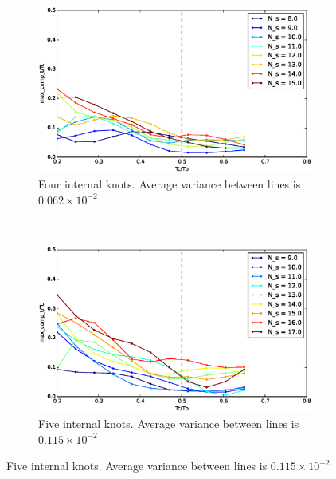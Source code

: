 \begin{figure}[!h]
        \centering
        \begin{subfigure}[b]{0.48\textwidth}
                \includegraphics[width=\textwidth]{./img/realtime/Scenario_0__N_knots_4/mcttc-tctp.eps}
                \caption{Four internal knots. Average variance between lines is $0.062\times 10^{-2}$}\label{fig:uni04}
        \end{subfigure}%
        ~ %
        \begin{subfigure}[b]{0.48\textwidth}
                \includegraphics[width=\textwidth]{./img/realtime/Scenario_0__N_knots_5/mcttc-tctp.eps}
                \caption{Five internal knots. Average variance between lines is $0.115\times 10^{-2}$}\label{fig:uni05}
        \end{subfigure}%
        

\end{figure}
